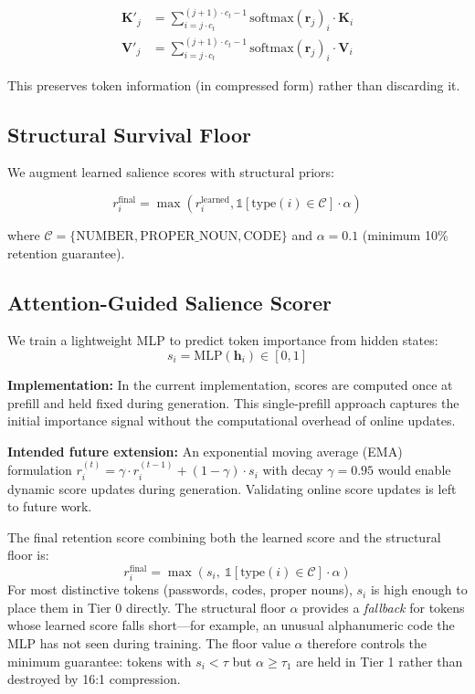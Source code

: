 \documentclass[11pt]{article}
\begin{document}
\begin{align}
\mathbf{K}'_j &= \sum_{i=j \cdot c_t}^{(j+1) \cdot c_t - 1} \text{softmax}(\mathbf{r}_j)_i \cdot \mathbf{K}_i \\
\mathbf{V}'_j &= \sum_{i=j \cdot c_t}^{(j+1) \cdot c_t - 1} \text{softmax}(\mathbf{r}_j)_i \cdot \mathbf{V}_i
\end{align}

This preserves token information (in compressed form) rather than discarding it.

\subsection{Structural Survival Floor}

We augment learned salience scores with structural priors:

\begin{equation}
r_i^{\text{final}} = \max\left(r_i^{\text{learned}}, \mathbb{1}[\text{type}(i) \in \mathcal{C}] \cdot \alpha\right)
\end{equation}

where $\mathcal{C} = \{\text{NUMBER}, \text{PROPER\_NOUN}, \text{CODE}\}$ and $\alpha=0.1$ (minimum 10\% retention guarantee).

\subsection{Attention-Guided Salience Scorer}
We train a lightweight MLP to predict token importance from hidden states:
\begin{equation}
s_i = \text{MLP}(\mathbf{h}_i) \in [0,1]
\end{equation}

\textbf{Implementation:} In the current implementation, scores are computed once at prefill and held fixed during generation. This single-prefill approach captures the initial importance signal without the computational overhead of online updates.

\textbf{Intended future extension:} An exponential moving average (EMA) formulation $r_i^{(t)} = \gamma \cdot r_i^{(t-1)} + (1-\gamma) \cdot s_i$ with decay $\gamma=0.95$ would enable dynamic score updates during generation. Validating online score updates is left to future work.

The final retention score combining both the learned score and the structural floor is:
\begin{equation}
r_i^{\text{final}} = \max\left(s_i,\ \mathbb{1}[\text{type}(i) \in \mathcal{C}]
\cdot \alpha\right)
\end{equation}
For most distinctive tokens (passwords, codes, proper nouns), $s_i$ is high enough
to place them in Tier 0 directly. The structural floor $\alpha$ provides a
\textit{fallback} for tokens whose learned score falls short---for example, an
unusual alphanumeric code the MLP has not seen during training. The floor value
$\alpha$ therefore controls the minimum guarantee: tokens with $s_i < \tau$ but
$\alpha \geq \tau_1$ are held in Tier 1 rather than destroyed by 16:1 compression.
\end{document}
